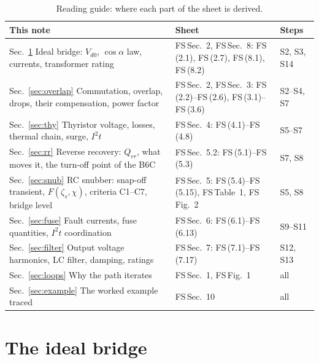 \documentclass[10pt,a4paper]{scrartcl}
\newcommand{\Vdo}{V_{d0}}
\newcommand{\iit}{I^{2}t}
\newcommand{\fs}[1]{\textsf{FS}\,(#1)}
\newcommand{\fssec}[1]{\textsf{FS}\,Sec.~#1}
\newcommand{\fstab}[1]{\textsf{FS}\,Table~#1}
\newcommand{\fsfig}[1]{\textsf{FS}\,Fig.~#1}
\begin{document}
\begin{table}[htb]
\centering\footnotesize
\caption{Reading guide: where each part of the sheet is derived.}
\label{tab:map}
\begin{tabular}{@{}p{7.2cm}p{6.8cm}p{1.8cm}@{}}
\toprule
This note & Sheet & Steps \\
\midrule
Sec.~\ref{sec:ideal} Ideal bridge: $\Vdo$, $\cos\alpha$ law, currents, transformer rating & \fssec{2}, \fssec{8}: \fs{2.1}, \fs{2.7}, \fs{8.1}, \fs{8.2} & S2, S3, S14 \\
Sec.~\ref{sec:overlap} Commutation, overlap, drops, their compensation, power factor & \fssec{2}, \fssec{3}: \fs{2.2}--\fs{2.6}, \fs{3.1}--\fs{3.6} & S2--S4, S7 \\
Sec.~\ref{sec:thy} Thyristor voltage, losses, thermal chain, surge, $\iit$ & \fssec{4}: \fs{4.1}--\fs{4.8} & S5--S7 \\
Sec.~\ref{sec:rr} Reverse recovery: $Q_{rr}$, what moves it, the turn-off point of the B6C & \fssec{5.2}: \fs{5.1}--\fs{5.3} & S7, S8 \\
Sec.~\ref{sec:snub} RC snubber: snap-off transient, $F(\zeta_s,\chi)$, criteria C1--C7, bridge level & \fssec{5}: \fs{5.4}--\fs{5.15}, \fstab{1}, \fsfig{2} & S5, S8 \\
Sec.~\ref{sec:fuse} Fault currents, fuse quantities, $\iit$ coordination & \fssec{6}: \fs{6.1}--\fs{6.13} & S9--S11 \\
Sec.~\ref{sec:filter} Output voltage harmonics, LC filter, damping, ratings & \fssec{7}: \fs{7.1}--\fs{7.17} & S12, S13 \\
Sec.~\ref{sec:loops} Why the path iterates & \fssec{1}, \fsfig{1} & all \\
Sec.~\ref{sec:example} The worked example traced & \fssec{10} & all \\
\bottomrule
\end{tabular}
\end{table}

\section{The ideal bridge}\label{sec:ideal}
\end{document}
